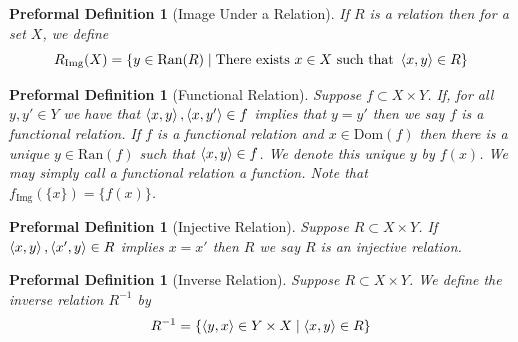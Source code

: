 \documentclass[oneside, 12pt]{book}
\theoremstyle{break}
\newtheorem{preformal definition}[definition]{Preformal Definition}
\newtheorem{preformal theorem}[theorem]{Preformal Theorem}
\begin{document}
			\begin{preformal definition}[Image Under a Relation]
				If $R$ is a relation then for a set $X$, we define
				\begin{equation*}
					R_{\text{Img}}(X) = \{y \in \text{Ran}(R) \mid \text{There exists } x\in X \text{ such that } \braket{x, y} \in R\}
				\end{equation*}
			\end{preformal definition}
			
			\begin{preformal definition}[Functional Relation]
				Suppose $f\subset X \times Y$.
				If, for all $y, y' \in Y$ we have that $\braket{x, y}, \braket{x, y'}\in f$ implies that $y=y'$ then we say $f$ is a functional relation.
				If $f$ is a functional relation and $x\in \text{Dom}(f)$ then there is a unique $y\in \text{Ran}(f)$ such that $\braket{x, y} \in f$.
				We denote this unique $y$ by $f(x)$.
				We may simply call a functional relation a function.
				Note that $f_{\text{Img}}(\{x\}) = \{f(x)\}$.
			\end{preformal definition}
			
			\begin{preformal definition}[Injective Relation]
				Suppose $R\subset X \times Y$.
				If $\braket{x, y}, \braket{x', y} \in R$ implies $x=x'$ then $R$ we say $R$ is an injective relation.
			\end{preformal definition}
			
			\begin{preformal definition}[Inverse Relation]
				Suppose $R\subset X\times Y$.
				We define the inverse relation $R^{-1}$ by
				\begin{align*}
					R^{-1} = \{\braket{y, x}\in Y\times X \mid \braket{x, y}\in R\}
				\end{align*}
			\end{preformal definition}
			
\end{document}
